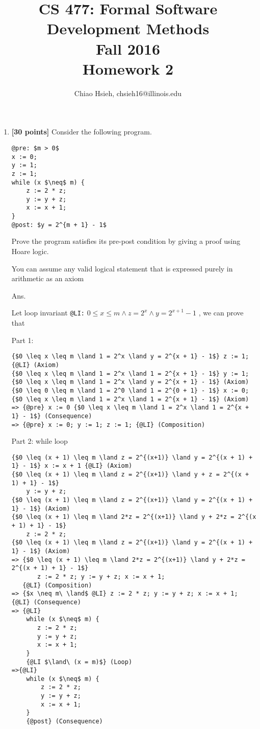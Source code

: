 \documentclass{article}
\title{\Large\bfseries CS 477: Formal Software Development Methods \\
Fall 2016 \\
Homework 2}
\author{Chiao Hsieh, chsieh16@illinois.edu}
\begin{document}
\maketitle

\begin{enumerate}
\item \textbf{[30 points]}
Consider the following program.
\begin{lstlisting}
@pre: $m > 0$
x := 0;
y := 1;
z := 1;
while (x $\neq$ m) {
    z := 2 * z;
    y := y + z;
    x := x + 1;
}
@post: $y = 2^{m + 1} - 1$
\end{lstlisting}

Prove the program satisfies its pre-post condition by giving a proof using
Hoare logic.

You can assume any valid logical statement that is expressed purely in
arithmetic as an axiom

\medskip
Ans.
\medskip

Let loop invariant \verb|@LI:| $0 \leq x \leq m \land z = 2^x \land y = 2^{x + 1} - 1$ ,
we can prove that

Part 1:
\begin{lstlisting}
{$0 \leq x \leq m \land 1 = 2^x \land y = 2^{x + 1} - 1$} z := 1; {@LI} (Axiom)
{$0 \leq x \leq m \land 1 = 2^x \land 1 = 2^{x + 1} - 1$} y := 1; {$0 \leq x \leq m \land 1 = 2^x \land y = 2^{x + 1} - 1$} (Axiom)
{$0 \leq 0 \leq m \land 1 = 2^0 \land 1 = 2^{0 + 1} - 1$} x := 0; {$0 \leq x \leq m \land 1 = 2^x \land 1 = 2^{x + 1} - 1$} (Axiom)
=> {@pre} x := 0 {$0 \leq x \leq m \land 1 = 2^x \land 1 = 2^{x + 1} - 1$} (Consequence)
=> {@pre} x := 0; y := 1; z := 1; {@LI} (Composition)
\end{lstlisting}

Part 2: while loop
\begin{lstlisting}
{$0 \leq (x + 1) \leq m \land z = 2^{(x+1)} \land y = 2^{(x + 1) + 1} - 1$} x := x + 1 {@LI} (Axiom)
{$0 \leq (x + 1) \leq m \land z = 2^{(x+1)} \land y + z = 2^{(x + 1) + 1} - 1$}
    y := y + z;
{$0 \leq (x + 1) \leq m \land z = 2^{(x+1)} \land y = 2^{(x + 1) + 1} - 1$} (Axiom)
{$0 \leq (x + 1) \leq m \land 2*z = 2^{(x+1)} \land y + 2*z = 2^{(x + 1) + 1} - 1$}
    z := 2 * z;
{$0 \leq (x + 1) \leq m \land z = 2^{(x+1)} \land y = 2^{(x + 1) + 1} - 1$} (Axiom)
=> {$0 \leq (x + 1) \leq m \land 2*z = 2^{(x+1)} \land y + 2*z = 2^{(x + 1) + 1} - 1$}
       z := 2 * z; y := y + z; x := x + 1;
   {@LI} (Composition)
=> {$x \neq m\ \land$ @LI} z := 2 * z; y := y + z; x := x + 1; {@LI} (Consequence)
=> {@LI} 
    while (x $\neq$ m) {
       z := 2 * z;
       y := y + z;
       x := x + 1;
    }
    {@LI $\land\ (x = m)$} (Loop)
=>{@LI} 
    while (x $\neq$ m) {
        z := 2 * z;
        y := y + z;
        x := x + 1;
    }
    {@post} (Consequence)
\end{lstlisting}


\end{enumerate}
\end{document}
